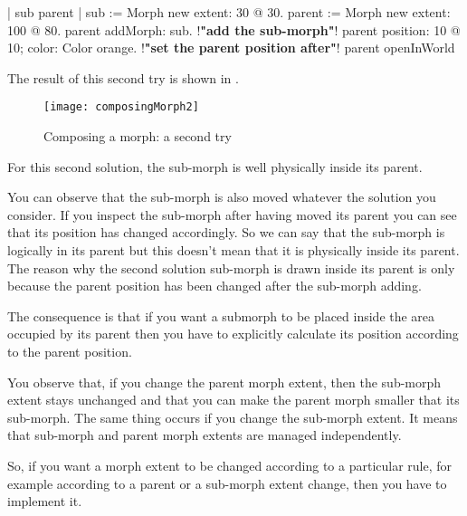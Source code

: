 \documentclass[a4paper,10pt,twoside]{book}
\begin{document}
\begin{code}
| sub parent |
sub := Morph new extent: 30 @ 30. 
parent := Morph new extent: 100 @ 80. 
parent addMorph: sub. !\textbf{"add the sub-morph"}!
parent position: 10 @ 10; color: Color orange. !\textbf{"set the parent position after"}!
parent openInWorld 
\end{code}
The result of this second try is shown in .
\begin{figure}[htbp]
\begin{center}
	\texttt{[image: composingMorph2]}
	\caption{Composing a morph: a second try}
\end{center}
\end{figure}

For this second solution, the sub-morph is well physically inside its parent.


You can observe that the sub-morph is also moved whatever the solution you consider. If you inspect the sub-morph after having moved its parent you can see that its position has changed accordingly. So we can say that the sub-morph is logically in its parent but this doesn't mean that it is physically inside its parent. The reason why the second solution sub-morph is drawn inside its parent is only because the parent position has been changed after the sub-morph adding. 

The consequence is that if you want a submorph to be placed inside the area occupied by its parent then you have to explicitly calculate its position according to the parent position.


You observe that, if you change the parent morph extent, then the sub-morph extent stays unchanged and that you can make the parent morph smaller that its sub-morph. The same thing occurs if you change the sub-morph extent. It means that sub-morph and parent morph extents are managed independently.

So, if you want a morph extent to be changed according to a particular rule, for example according to a parent or a sub-morph extent change, then you have to implement it.
\end{document}
